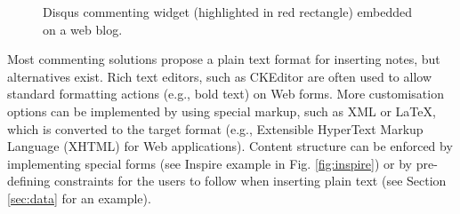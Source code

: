 \begin{figure}[!ht]
  \centering
  \caption[Disqus commenting widget embedded on a web blog]
          {Disqus commenting widget (highlighted in red rectangle) embedded on a web blog.}
  \label{fig:disqus}
\end{figure}

Most commenting solutions propose a plain text format for inserting notes, but
alternatives exist. Rich text editors, such as CKEditor \cite{ref:cked} are
often used to allow standard formatting actions (e.g., bold text) on Web forms.
More customisation options can be implemented by using special markup, such as
XML or \LaTeX, which is converted to the target format (e.g., Extensible
HyperText Markup Language (XHTML) for Web applications). Content structure can
be enforced by implementing special forms (see Inspire example in Fig.
\ref{fig:inspire}) or by pre-defining constraints for the users to follow when
inserting plain text (see Section \ref{sec:data} for an example).


